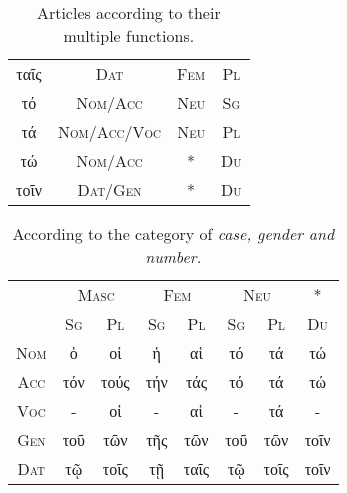 \documentclass[10pt]{memoir}
\newcommand{\tsc}[1]{\textsc{#1}}
\newcommand{\grc}[1]{\fontspec{Inter}#1}
\begin{document}
\begin{table}[H]
\begin{tabular}{c|ccc}
            \grc{ταῖς}             & \tsc{Dat}           & \tsc{Fem}             & \tsc{Pl}              \\
            \grc{τό}               & \tsc{Nom}/\tsc{Acc}       & \tsc{Neu}             & \tsc{Sg}              \\
            \grc{τά}               & \tsc{Nom}/\tsc{Acc}/\tsc{Voc}   & \tsc{Neu}             & \tsc{Pl}              \\
            \grc{τώ}               & \tsc{Nom}/\tsc{Acc}       & *             & \tsc{Du}              \\
            \grc{τοῖν}             & \tsc{Dat}/\tsc{Gen}       & *             & \tsc{Du}
        \end{tabular}
        \caption{Articles according to their multiple functions.}
    \end{table}
    \nopagebreak
    \begin{table}[H]
        \begin{tabular}{c|ccccccc}
            \multicolumn{1}{l}{} & \multicolumn{2}{c}{\tsc{Masc}} & \multicolumn{2}{c}{\tsc{Fem}} & \multicolumn{2}{c}{\tsc{Neu}} & *                        \\
            \multicolumn{1}{l}{} & \tsc{Sg}         & \tsc{Pl}          & \tsc{Sg}         & \tsc{Pl}         & \tsc{Sg}         & \tsc{Pl}         & \tsc{Du}                       \\
            \hline
            \tsc{Nom}                  & \grc{ὁ}          & \grc{οἱ}          & \grc{ἡ}          & \grc{αἱ}         & \grc{τό}         & \grc{τά}         & \grc{τώ}                       \\
            \tsc{Acc}                  & \grc{τόν}        & \grc{τούς}        & \grc{τήν}        & \grc{τάς}        & \grc{τό}         & \grc{τά}         & \grc{τώ}                       \\
            \tsc{Voc}                  & -          & \grc{οἱ}          & -          & \grc{αἱ}         & -          & \grc{τά}         & -                        \\
            \tsc{Gen}                  & \grc{τοῦ}        & \grc{τῶν}         & \grc{τῆς}        & \grc{τῶν}        & \grc{τοῦ}        & \grc{τῶν}        & \grc{τοῖν}                     \\
            \tsc{Dat}                  & \grc{τῷ}         & \grc{τοῖς}        & \grc{τῇ}         & \grc{ταῖς}       & \grc{τῷ}         & \grc{τοῖς}       & \multicolumn{1}{l}{\grc{τοῖν}}
        \end{tabular}
        \caption{According to the category of \em case, \em gender and \em number.}
    \end{table}
\end{document}
